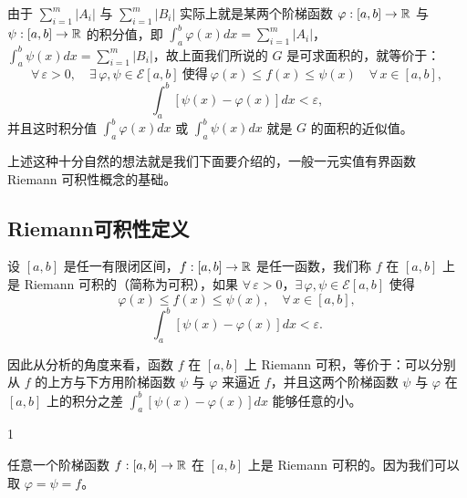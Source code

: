 由于 \(\sum_{i=1}^m|A_i|\) 与 \(\sum_{i=1}^m|B_i|\) 实际上就是某两个阶梯函数 \(\varphi:[a,b]\to\mathbb{R}\) 与 \(\psi:[a,b]\to\mathbb{R}\) 的积分值，即 \(\int_a^b\varphi(x)dx=\sum_{i=1}^m|A_i|\)，\(\int_a^b\psi(x)dx=\sum_{i=1}^m|B_i|\)，故上面我们所说的 \(G\) 是可求面积的，就等价于：
\[
\forall\,\varepsilon>0,\quad\exists\,\varphi,\psi\in\mathscr{E}[a,b]\ \text{使得}\ \varphi(x)\le f(x)\le\psi(x)\quad\forall\,x\in[a,b],
\]
\[
\int_a^b[\psi(x)-\varphi(x)]dx<\varepsilon,
\]
并且这时积分值 \(\int_a^b\varphi(x)dx\) 或 \(\int_a^b\psi(x)dx\) 就是 \(G\) 的面积的近似值。

上述这种十分自然的想法就是我们下面要介绍的，一般一元实值有界函数 Riemann 可积性概念的基础。

\subsection{Riemann可积性定义}
	\label{sec:5-2-2}

\begin{mydef*}{}

	设 \([a,b]\) 是任一有限闭区间，\(f:[a,b]\to\mathbb{R}\) 是任一函数，我们称 \(f\) 在 \([a,b]\) 上是 Riemann 可积的（简称为可积），如果 \(\forall\,\varepsilon>0\)，\(\exists\,\varphi,\psi\in\mathscr{E}[a,b]\) 使得
	\[
	\varphi(x)\le f(x)\le\psi(x),\quad\forall\,x\in[a,b],
	\]
	\[
	\int_a^b[\psi(x)-\varphi(x)]dx<\varepsilon.
	\]

\end{mydef*}

因此从分析的角度来看，函数 \(f\) 在 \([a,b]\) 上 Riemann 可积，等价于：可以分别从 \(f\) 的上方与下方用阶梯函数 \(\psi\) 与 \(\varphi\) 来逼近 \(f\)，并且这两个阶梯函数 \(\psi\) 与 \(\varphi\) 在 \([a,b]\) 上的积分之差 \(\int_a^b[\psi(x)-\varphi(x)]dx\) 能够任意的小。

\begin{sourceexample}{1}

	任意一个阶梯函数 \(f:[a,b]\to\mathbb{R}\) 在 \([a,b]\) 上是 Riemann 可积的。因为我们可以取 \(\varphi=\psi=f\)。

\end{sourceexample}

